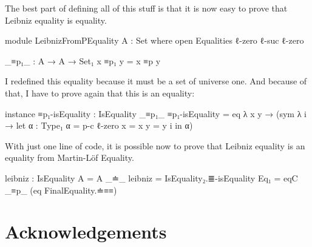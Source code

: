 \documentclass{article}
\begin{document}
The best part of defining all of this stuff is that it is now easy to prove that Leibniz equality is equality.

\begin{code}
module LeibnizFromPEquality {A : Set} where
  open Equalities {ℓ-zero} {ℓ-suc ℓ-zero}

  _≡p₁_ : A → A → Set₁
  x ≡p₁ y = x ≡p y
\end{code}

I redefined this equality because it must be a set of universe one.
And because of that, I have to prove again that this is an equality:

\begin{code}
  instance
    ≡p₁-isEquality : IsEquality _≡p₁_
    ≡p₁-isEquality = eq λ {x y} → (sym λ i → let
      α : Type₁
      α = p-c {ℓ-zero} {x = x} {y = y} i
      in α)
\end{code}

With just one line of code, it is possible now to prove that Leibniz equality is an equality
from Martin-Löf Equality.

\begin{code}
  leibniz : IsEquality {A = A} _≐_
  leibniz = IsEquality₂.≣-isEquality {Eq₁ = eqC _≡p_} (eq FinalEquality.≐≡≡)
\end{code}

\section*{Acknowledgements}



\end{document}
